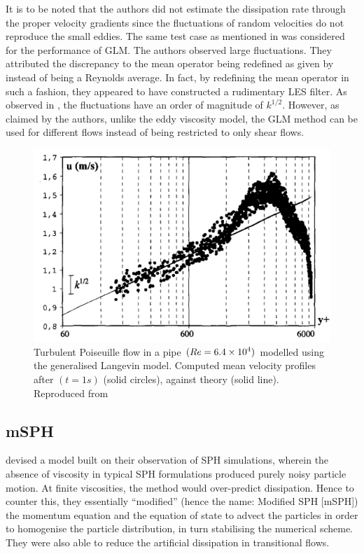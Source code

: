 It is to be noted that the authors did not estimate the dissipation rate through the proper velocity gradients since the fluctuations of random velocities do not reproduce the small eddies.
The same test case as mentioned in  was considered for the performance of GLM. 
The authors observed large fluctuations. They attributed the discrepancy to the mean operator being redefined as given by  instead of being a Reynolds average. In fact, by redefining the mean operator in such a fashion, they appeared to have constructed a rudimentary LES filter. 
As observed in , the fluctuations have an order of magnitude of $k^{1/2}$. However, as claimed by the authors, unlike the eddy viscosity model, the GLM method can be used for different flows instead of being restricted to only shear flows.
\begin{figure}[H]
    \centering
    \includegraphics{Figures/research_papers/violeau2002-GLM-result.png}
    \caption{Turbulent Poiseuille flow in a pipe $(Re = 6.4 \times {10}^{4})$ modelled using the generalised Langevin model. Computed mean velocity profiles after $(t=1s)$ (solid circles), against theory (solid line). Reproduced from \cite{VIOLEAU2002}}
    \label{fig:violeau2002-GLM-result}
\end{figure}


\subsection{mSPH}
\cite{Adami2012} devised a model built on their observation of SPH simulations, wherein the absence of viscosity in typical SPH formulations produced purely noisy particle motion. At finite viscosities, the method would over-predict dissipation. Hence to counter this, they essentially ``modified'' (hence the name: Modified SPH [mSPH]) the momentum equation and the equation of state to advect the particles in order to homogenise the particle distribution, in turn stabilising the numerical scheme. They were also able to reduce the artificial dissipation in transitional flows.

